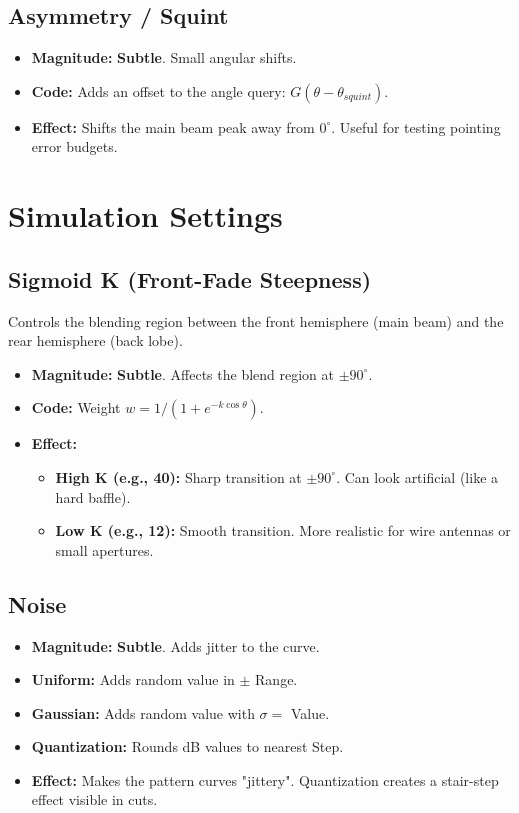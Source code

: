 \documentclass[11pt,a4paper]{article}
\begin{document}
\subsection{Asymmetry / Squint}
\begin{itemize}
    \item \textbf{Magnitude:} \textbf{Subtle}. Small angular shifts.
    \item \textbf{Code:} Adds an offset to the angle query: $G(\theta - \theta_{squint})$.
    \item \textbf{Effect:} Shifts the main beam peak away from $0^\circ$. Useful for testing pointing error budgets.
\end{itemize}

\newpage
\section{Simulation Settings}

\subsection{Sigmoid K (Front-Fade Steepness)}
Controls the blending region between the front hemisphere (main beam) and the rear hemisphere (back lobe).
\begin{itemize}
    \item \textbf{Magnitude:} \textbf{Subtle}. Affects the blend region at $\pm 90^\circ$.
    \item \textbf{Code:} Weight $w = 1 / (1 + e^{-k \cos \theta})$.
    \item \textbf{Effect:}
    \begin{itemize}
        \item \textbf{High K (e.g., 40):} Sharp transition at $\pm 90^\circ$. Can look artificial (like a hard baffle).
        \item \textbf{Low K (e.g., 12):} Smooth transition. More realistic for wire antennas or small apertures.
    \end{itemize}
\end{itemize}

\subsection{Noise}
\begin{itemize}
    \item \textbf{Magnitude:} \textbf{Subtle}. Adds jitter to the curve.
    \item \textbf{Uniform:} Adds random value in $\pm$ Range.
    \item \textbf{Gaussian:} Adds random value with $\sigma =$ Value.
    \item \textbf{Quantization:} Rounds dB values to nearest Step.
    \item \textbf{Effect:} Makes the pattern curves "jittery". Quantization creates a stair-step effect visible in cuts.
\end{itemize}
\end{document}
